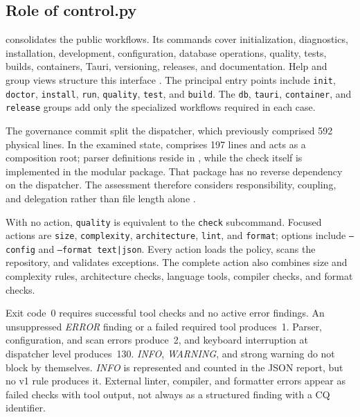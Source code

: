 \subsection{Role of control.py}
\label{subsec:rolle-control-py}

 consolidates the public workflows. Its commands cover
initialization, diagnostics, installation, development, configuration,
database operations, quality, tests, builds, containers, Tauri, versioning, releases,
and documentation. Help and group views structure this interface
\parencite{kleiveist2026control,kleiveist2026quality-implementation}.
The principal entry points include \texttt{init}, \texttt{doctor},
\texttt{install}, \texttt{run}, \texttt{quality}, \texttt{test}, and \texttt{build}. The
\texttt{db}, \texttt{tauri}, \texttt{container}, and \texttt{release} groups
add only the specialized workflows required in each case.



The governance commit split the dispatcher, which previously comprised 592
physical lines. In the examined state,  comprises 197
lines and acts as a composition root; parser definitions reside in
, while the check itself is implemented in the
modular  package. That package has no reverse dependency
on the dispatcher. The assessment therefore considers responsibility,
coupling, and delegation rather than file length alone
\parencite{kleiveist2026governance-commit}.

With no action, \texttt{quality} is equivalent to the \texttt{check}
subcommand. Focused actions are \texttt{size}, \texttt{complexity},
\texttt{architecture}, \texttt{lint}, and \texttt{format}; options include
\texttt{--config} and \texttt{--format text|json}. Every action loads the
policy, scans the repository, and validates exceptions. The complete action
also combines size and complexity rules, architecture checks, language tools,
compiler checks, and format checks.

Exit code~0 requires successful tool checks and no active error findings. An
unsuppressed \emph{ERROR} finding or a failed required tool produces~1.
Parser, configuration, and scan errors produce~2, and keyboard interruption
at dispatcher level produces~130. \emph{INFO}, \emph{WARNING}, and strong
warning do not block by themselves. \emph{INFO} is represented and counted in
the JSON report, but no v1 rule produces it. External linter, compiler, and
formatter errors appear as failed checks with tool output, not always as a
structured finding with a CQ identifier.

